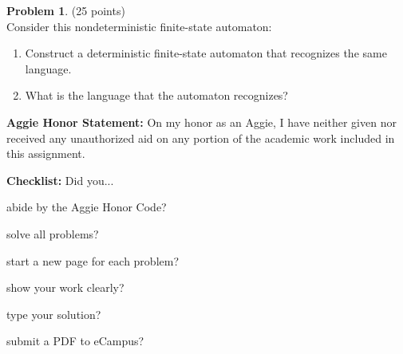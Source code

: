 \documentclass{article}
\theoremstyle{definition}
\newtheorem{problem}{Problem}
\newtheorem*{solution}{Solution}
\newcommand{\honor}{\noindent \textbf{Aggie Honor Statement: }On my honor as an Aggie, I have neither
  given nor received any unauthorized aid on any portion of the academic work included in this assignment.
}
\newcommand{\checklist}{\noindent\textbf{Checklist:}
Did you...
\begin{compactenum}
\item abide by the Aggie Honor Code?
\item solve all problems?
\item start a new page for each problem?
\item show your work clearly?
\item type your solution?
\item submit a PDF to eCampus?
\end{compactenum}
}
\begin{document}


\begin{problem} (25 points)\\
Consider this nondeterministic finite-state automaton:\\


\begin{enumerate}
\item Construct a deterministic finite-state automaton that recognizes the same language.
\item What is the language that the automaton recognizes?
\end{enumerate}
\end{problem}



\bigskip
\honor

\bigskip
\checklist
\end{document}
